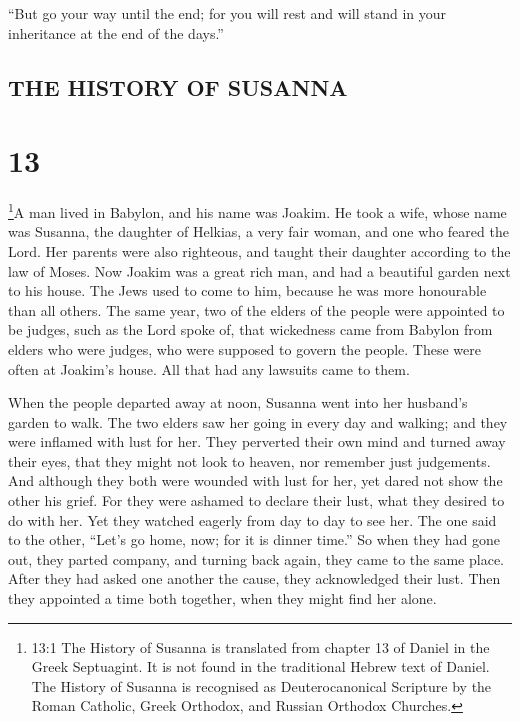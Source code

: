  ``But go your way until the end; for you will rest and
will stand in your inheritance at the end of the days.''

\hypertarget{the-history-of-susanna}{%
\subsection{THE HISTORY OF SUSANNA}\label{the-history-of-susanna}}

\hypertarget{section-12}{%
\section{13}\label{section-12}}

 \footnote{13:1 The History of Susanna is translated from
  chapter 13 of Daniel in the Greek Septuagint. It is not found in the
  traditional Hebrew text of Daniel. The History of Susanna is
  recognised as Deuterocanonical Scripture by the Roman Catholic, Greek
  Orthodox, and Russian Orthodox Churches.}A man lived in Babylon, and
his name was Joakim.  He took a wife, whose name was
Susanna, the daughter of Helkias, a very fair woman, and one who feared
the Lord.  Her parents were also righteous, and taught their
daughter according to the law of Moses.  Now Joakim was a
great rich man, and had a beautiful garden next to his house. The Jews
used to come to him, because he was more honourable than all others.
 The same year, two of the elders of the people were
appointed to be judges, such as the Lord spoke of, that wickedness came
from Babylon from elders who were judges, who were supposed to govern
the people.  These were often at Joakim's house. All that
had any lawsuits came to them.

 When the people departed away at noon, Susanna went into
her husband's garden to walk.  The two elders saw her going
in every day and walking; and they were inflamed with lust for her.
 They perverted their own mind and turned away their eyes,
that they might not look to heaven, nor remember just judgements.
 And although they both were wounded with lust for her, yet
dared not show the other his grief.  For they were ashamed
to declare their lust, what they desired to do with her. 
Yet they watched eagerly from day to day to see her.  The
one said to the other, ``Let's go home, now; for it is dinner time.''
 So when they had gone out, they parted company, and
turning back again, they came to the same place. After they had asked
one another the cause, they acknowledged their lust. Then they appointed
a time both together, when they might find her alone.

